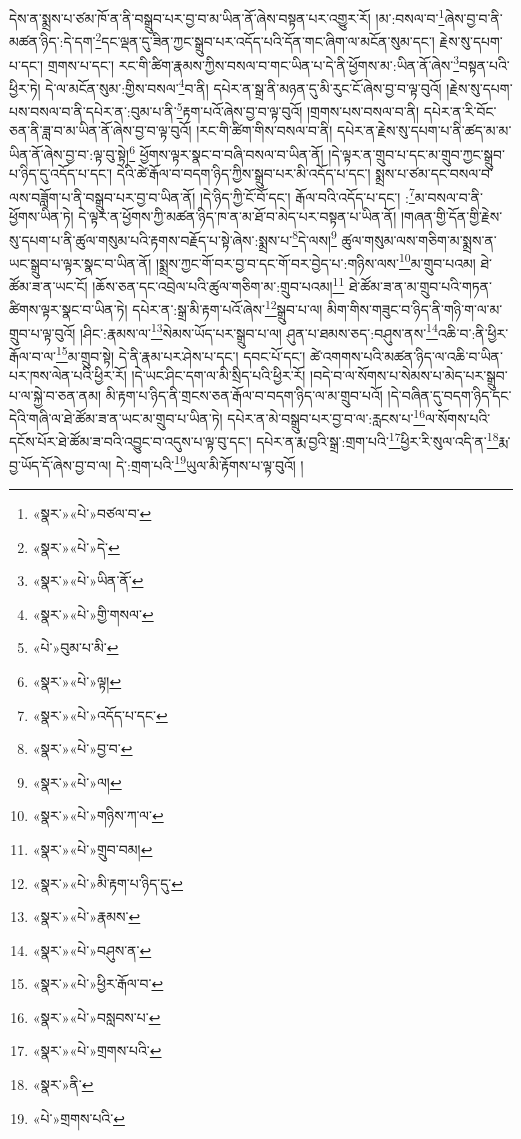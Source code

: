 དེས་ན་སྨྲས་པ་ཙམ་ཁོ་ན་ནི་བསྒྲུབ་པར་བྱ་བ་མ་ཡིན་ནོ་ཞེས་བསྟན་པར་འགྱུར་རོ། །མ་:བསལ་བ་\footnote{«སྣར་»«པེ་»བཙལ་བ་}ཞེས་བྱ་བ་ནི་མཚན་ཉིད་:དེ་དག་\footnote{«སྣར་»«པེ་»དེ་}དང་ལྡན་དུ་ཟིན་ཀྱང་སྒྲུབ་པར་འདོད་པའི་དོན་གང་ཞིག་ལ་མངོན་སུམ་དང་། རྗེས་སུ་དཔག་པ་དང་། གྲགས་པ་དང་། རང་གི་ཚིག་རྣམས་ཀྱིས་བསལ་བ་གང་ཡིན་པ་དེ་ནི་ཕྱོགས་མ་:ཡིན་ནོ་ཞེས་\footnote{«སྣར་»«པེ་»ཡིན་ནོ་}བསྟན་པའི་ཕྱིར་ཏེ། དེ་ལ་མངོན་སུམ་:གྱིས་བསལ་\footnote{«སྣར་»«པེ་»གྱི་གསལ་}བ་ནི། དཔེར་ན་སྒྲ་ནི་མཉན་དུ་མི་རུང་ངོ་ཞེས་བྱ་བ་ལྟ་བུའོ། །རྗེས་སུ་དཔག་པས་བསལ་བ་ནི་དཔེར་ན་:བུམ་པ་ནི་\footnote{«པེ་»བུམ་པ་མི་}རྟག་པའོ་ཞེས་བྱ་བ་ལྟ་བུའོ། །གྲགས་པས་བསལ་བ་ནི། དཔེར་ན་རི་བོང་ཅན་ནི་ཟླ་བ་མ་ཡིན་ནོ་ཞེས་བྱ་བ་ལྟ་བུའོ། །རང་གི་ཚིག་གིས་བསལ་བ་ནི། དཔེར་ན་རྗེས་སུ་དཔག་པ་ནི་ཚད་མ་མ་ཡིན་ནོ་ཞེས་བྱ་བ་:ལྟ་བུ་སྟེ།\footnote{«སྣར་»«པེ་»ལྟ།} ཕྱོགས་ལྟར་སྣང་བ་བཞི་བསལ་བ་ཡིན་ནོ། །དེ་ལྟར་ན་གྲུབ་པ་དང་མ་གྲུབ་ཀྱང་སྒྲུབ་པ་ཉིད་དུ་འདོད་པ་དང་། དེའི་ཚེ་རྒོལ་བ་བདག་ཉིད་ཀྱིས་སྒྲུབ་པར་མི་འདོད་པ་དང་། སྨྲས་པ་ཙམ་དང་བསལ་བ་ལས་བཟློག་པ་ནི་བསྒྲུབ་པར་བྱ་བ་ཡིན་ནོ། །དེ་ཉིད་ཀྱི་ངོ་བོ་དང་། རྒོལ་བའི་འདོད་པ་དང་། :\footnote{«སྣར་»«པེ་»འདོད་པ་དང་}མ་བསལ་བ་ནི་ཕྱོགས་ཡིན་ཏེ། དེ་ལྟར་ན་ཕྱོགས་ཀྱི་མཚན་ཉིད་ཁ་ན་མ་ཐོ་བ་མེད་པར་བསྟན་པ་ཡིན་ནོ། །གཞན་གྱི་དོན་གྱི་རྗེས་སུ་དཔག་པ་ནི་ཚུལ་གསུམ་པའི་རྟགས་བརྗོད་པ་སྟེ་ཞེས་:སྨྲས་པ་\footnote{«སྣར་»«པེ་»བྱ་བ་}དེ་ལས།\footnote{«སྣར་»«པེ་»ལ།} ཚུལ་གསུམ་ལས་གཅིག་མ་སྨྲས་ན་ཡང་སྒྲུབ་པ་ལྟར་སྣང་བ་ཡིན་ནོ། །སྨྲས་ཀྱང་གོ་བར་བྱ་བ་དང་གོ་བར་བྱེད་པ་:གཉིས་ལས་\footnote{«སྣར་»«པེ་»གཉིས་ཀ་ལ་}མ་གྲུབ་པའམ། ཐེ་ཚོམ་ཟ་ན་ཡང་ངོ། །ཆོས་ཅན་དང་འབྲེལ་པའི་ཚུལ་གཅིག་མ་:གྲུབ་པའམ།\footnote{«སྣར་»«པེ་»གྲུབ་བམ།} ཐེ་ཚོམ་ཟ་ན་མ་གྲུབ་པའི་གཏན་ཚིགས་ལྟར་སྣང་བ་ཡིན་ཏེ། དཔེར་ན་:སྒྲ་མི་རྟག་པའོ་ཞེས་\footnote{«སྣར་»«པེ་»མི་རྟག་པ་ཉིད་དུ་}སྒྲུབ་པ་ལ། མིག་གིས་གཟུང་བ་ཉིད་ནི་གཉི་ག་ལ་མ་གྲུབ་པ་ལྟ་བུའོ། །ཤིང་:རྣམས་ལ་\footnote{«སྣར་»«པེ་»རྣམས་}སེམས་ཡོད་པར་སྒྲུབ་པ་ལ། ཤུན་པ་ཐམས་ཅད་:བཤུས་ནས་\footnote{«སྣར་»«པེ་»བཤུས་ན་}འཆི་བ་:ནི་ཕྱིར་རྒོལ་བ་ལ་\footnote{«སྣར་»«པེ་»ཕྱིར་རྒོལ་བ་}མ་གྲུབ་སྟེ། དེ་ནི་རྣམ་པར་ཤེས་པ་དང་། དབང་པོ་དང་། ཚེ་འགགས་པའི་མཚན་ཉིད་ལ་འཆི་བ་ཡིན་པར་ཁས་ལེན་པའི་ཕྱིར་རོ། །དེ་ཡང་ཤིང་དག་ལ་མི་སྲིད་པའི་ཕྱིར་རོ། །བདེ་བ་ལ་སོགས་པ་སེམས་པ་མེད་པར་སྒྲུབ་པ་ལ་སྐྱེ་བ་ཅན་ནམ། མི་རྟག་པ་ཉིད་ནི་གྲངས་ཅན་རྒོལ་བ་བདག་ཉིད་ལ་མ་གྲུབ་པའོ། །དེ་བཞིན་དུ་བདག་ཉིད་དང་དེའི་གཞི་ལ་ཐེ་ཚོམ་ཟ་ན་ཡང་མ་གྲུབ་པ་ཡིན་ཏེ། དཔེར་ན་མེ་བསྒྲུབ་པར་བྱ་བ་ལ་:རླངས་པ་\footnote{«སྣར་»«པེ་»བསླབས་པ་}ལ་སོགས་པའི་དངོས་པོར་ཐེ་ཚོམ་ཟ་བའི་འབྱུང་བ་འདུས་པ་ལྟ་བུ་དང་། དཔེར་ན་རྨ་བྱའི་སྒྲ་:གྲག་པའི་\footnote{«སྣར་»«པེ་»གྲགས་པའི་}ཕྱིར་རི་སུལ་འདི་ན་\footnote{«སྣར་»ནི་}རྨ་བྱ་ཡོད་དོ་ཞེས་བྱ་བ་ལ། དེ་:གྲག་པའི་\footnote{«པེ་»གྲགས་པའི་}ཡུལ་མི་རྟོགས་པ་ལྟ་བུའོ། །
